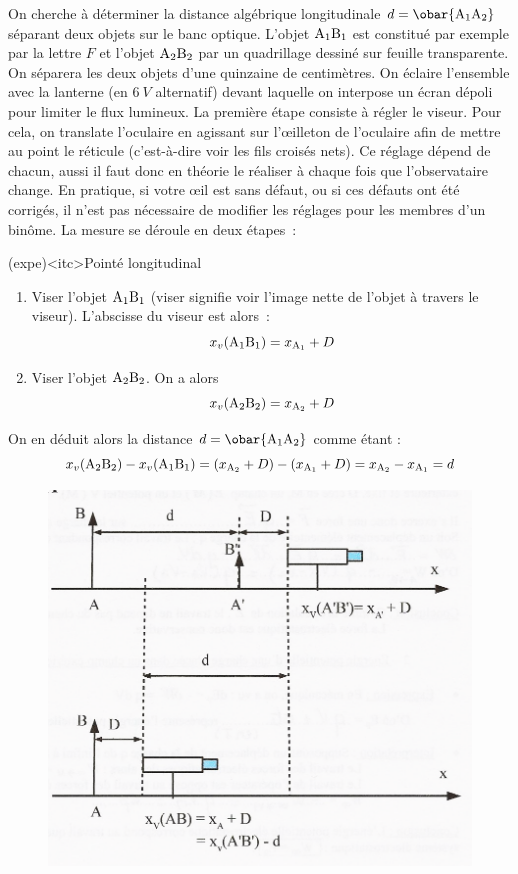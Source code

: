 \documentclass[../main/main.tex]{subfiles}
\begin{document}
On cherche à déterminer la distance algébrique longitudinale $d = \obar{\rm
		A_1A_2}$ séparant deux objets sur le banc optique. L'objet $\rm A_1B_1$ est
constitué par exemple par la lettre $F$ et l'objet $\rm A_2B_2$ par un
quadrillage dessiné sur feuille transparente. On séparera les deux objets d'une
quinzaine de centimètres. On éclaire l'ensemble avec la lanterne (en $\SI{6}{V}$
alternatif) devant laquelle on interpose un écran dépoli pour limiter le flux
lumineux.
\bigbreak
La première étape consiste à régler le viseur. Pour cela, on translate
l'oculaire en agissant sur l'œilleton de l'oculaire afin de mettre au point le
réticule (c'est-à-dire voir les fils croisés nets). Ce réglage dépend de chacun,
aussi il faut donc en théorie le réaliser à chaque fois que l'observataire
change. En pratique, si votre œil est sans défaut, ou si ces défauts ont été
corrigés, il n'est pas nécessaire de modifier les réglages pour les membres d'un
binôme.
\bigbreak
La mesure se déroule en deux étapes~:
\begin{tcb}(expe)<itc>{Pointé longitudinal}
	\begin{enumerate}
		\item Viser l'objet $\rm A_1B_1$ (viser signifie voir l'image nette de
		      l'objet à travers le viseur). L'abscisse du viseur est alors~:
		      \[
			      x_{v}({\rm A_1B_1}) = x_{\rm A_1}+D
		      \]
		\item Viser l'objet $\rm A_2B_2$. On a alors
		      \[
			      x_{v}({\rm A_2B_2}) = x_{\rm A_2}+D
		      \]
	\end{enumerate}

	On en déduit alors la distance $d = \obar{\rm A_1A_2}$ comme étant :
	\[
		x_{v}({\rm A_2B_2}) - x_{v}({\rm A_1B_1}) =
		(x_{\rm A_2}+D) - (x_{\rm A_1}+D) =
		x_{\rm A_2} - x_{\rm A_1} = d
	\]
\end{tcb}

\begin{figure}[htbp]
	\centering
	\includegraphics[width=.5\linewidth]{principe1}
\end{figure}
\end{document}
